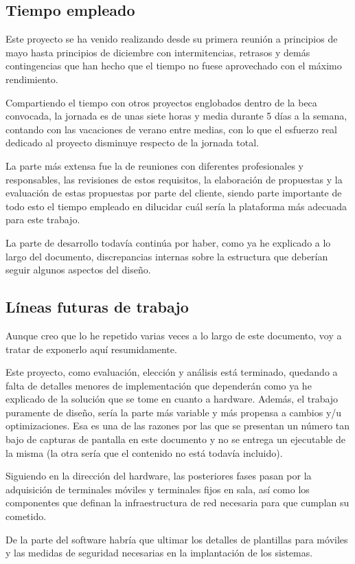 \subsection{Tiempo empleado}
\par Este proyecto se ha venido realizando desde su primera reunión a principios de mayo hasta principios de diciembre con intermitencias, retrasos y demás contingencias que han hecho que el tiempo no fuese aprovechado con el máximo rendimiento. 
\par Compartiendo el tiempo con otros proyectos englobados dentro de la beca convocada, la jornada es de unas siete horas y media durante 5 días a la semana, contando con las vacaciones de verano entre medias, con lo que el esfuerzo real dedicado al proyecto disminuye respecto de la jornada total.
\par La parte más extensa fue la de reuniones con diferentes profesionales y responsables, las revisiones de estos requisitos, la elaboración de propuestas y la evaluación de estas propuestas por parte del cliente, siendo parte importante de todo esto el tiempo empleado en dilucidar cuál sería la plataforma más adecuada para este trabajo.
\par La parte de desarrollo todavía continúa por haber, como ya he explicado a lo largo del documento, discrepancias internas sobre la estructura que deberían seguir algunos aspectos del diseño.

\subsection{Líneas futuras de trabajo}
\par Aunque creo que lo he repetido varias veces a lo largo de este documento, voy a tratar de exponerlo aquí resumidamente.
\par Este proyecto, como evaluación, elección y análisis está terminado, quedando a falta de detalles menores de implementación que dependerán como ya he explicado de la solución que se tome en cuanto a hardware. Además, el trabajo puramente de diseño, sería la parte más variable y más propensa a cambios y/u optimizaciones. Esa es una de las razones por las que se presentan un número tan bajo de capturas de pantalla en este documento y no se entrega un ejecutable de la misma (la otra sería que el contenido no está todavía incluido).

\par Siguiendo en la dirección del hardware, las posteriores fases pasan por la adquisición de terminales móviles y terminales fijos en sala, así como los componentes que definan la infraestructura de red necesaria para que cumplan su cometido.
\par De la parte del software habría que ultimar los detalles de plantillas para móviles y las medidas de seguridad necesarias en la implantación de los sistemas.

